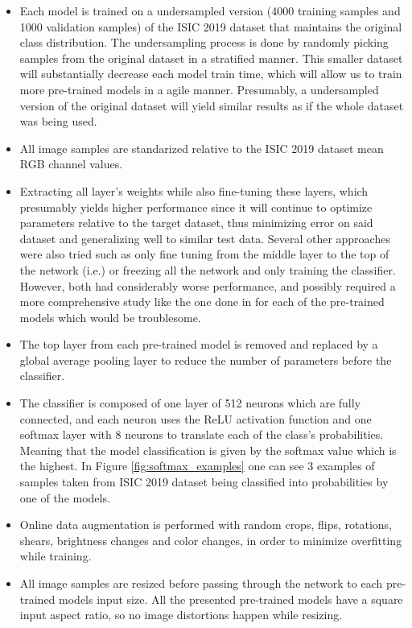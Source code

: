     \begin{itemize}
        \item Each model is trained on a undersampled version (4000 training samples and 1000 validation samples) of the ISIC 2019 dataset that maintains the original class distribution. The undersampling process is done by randomly picking samples from the original dataset in a stratified manner. This smaller dataset will substantially decrease each model train time, which will allow us to train more pre-trained models in a agile manner. Presumably, a undersampled version of the original dataset will yield similar results as if the whole dataset was being used. 
        \item All image samples are standarized relative to the ISIC 2019 dataset mean RGB channel values.
        \item Extracting all layer's weights while also fine-tuning these layers, which presumably yields higher performance since it will continue to optimize parameters relative to the target dataset, thus minimizing error on said dataset and generalizing well to similar test data. Several other approaches were also tried such as only fine tuning from the middle layer to the top of the network (i.e.) or freezing all the network and only training the classifier. However, both had considerably worse performance, and possibly required a more comprehensive study like the one done in \cite{maia} for each of the pre-trained models which would be troublesome.
        \item The top layer from each pre-trained model is removed and replaced by a global average pooling layer to reduce the number of parameters before the classifier. 
        \item The classifier is composed of one layer of 512 neurons which are fully connected, and each neuron uses the ReLU activation function and one softmax layer with 8 neurons to translate each of the class's probabilities. Meaning that the model classification is given by the softmax value which is the highest. In Figure \ref{fig:softmax_examples} one can see 3 examples of samples taken from ISIC 2019 dataset being classified into probabilities by one of the models.
        \item Online data augmentation is performed with random crops, flips, rotations, shears, brightness changes and color changes, in order to minimize overfitting while training.
        \item All image samples are resized before passing through the network to each pre-trained models input size. All the presented pre-trained models have a square input aspect ratio, so no image distortions happen while resizing.

\end{itemize}
